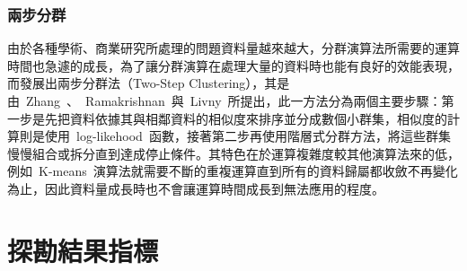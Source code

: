 \subsubsection{兩步分群}

由於各種學術、商業研究所處理的問題資料量越來越大，分群演算法所需要的運算時間也急遽的成長，為了讓分群演算在處理大量的資料時也能有良好的效能表現，而發展出兩步分群法（Two-Step Clustering），其是由~Zhang~、~Ramakrishnan~與~Livny\cite{zhang1996birch}~所提出，此一方法分為兩個主要步驟：第一步是先把資料依據其與相鄰資料的相似度來排序並分成數個小群集，相似度的計算則是使用~log-likehood~函數，接著第二步再使用階層式分群方法，將這些群集慢慢組合或拆分直到達成停止條件。其特色在於運算複雜度較其他演算法來的低，例如~K-means~演算法就需要不斷的重複運算直到所有的資料歸屬都收斂不再變化為止，因此資料量成長時也不會讓運算時間成長到無法應用的程度。


\section{探勘結果指標}





